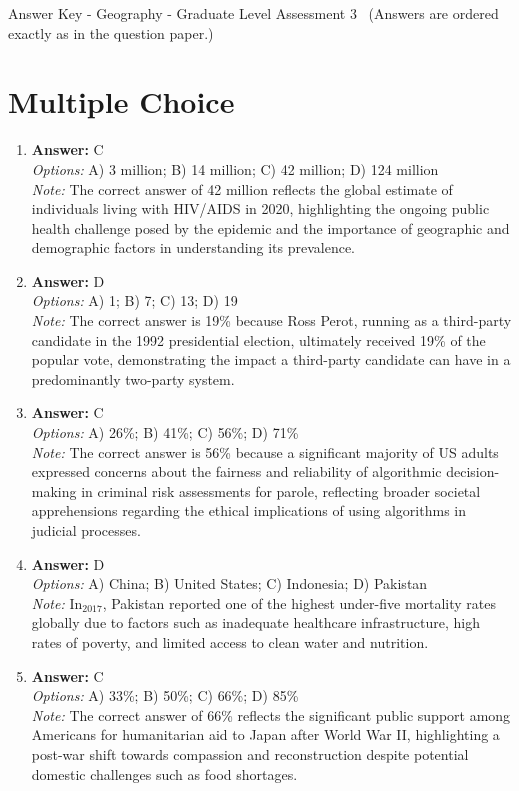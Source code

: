 \documentclass[12pt]{article}
\begin{document}
\begin{center}
Answer Key - Geography - Graduate Level Assessment 3 \
\small (Answers are ordered exactly as in the question paper.)
\end{center}

\section*{Multiple Choice}
\begin{enumerate}[label=\arabic*.]
\item \textbf{Answer:} C
\\ \textit{Options:} A) 3 million; B) 14 million; C) 42 million; D) 124 million
\\ \textit{Note:} The correct answer of 42 million reflects the global estimate of individuals living with HIV/AIDS in 2020, highlighting the ongoing public health challenge posed by the epidemic and the importance of geographic and demographic factors in understanding its prevalence.
\item \textbf{Answer:} D
\\ \textit{Options:} A) 1; B) 7; C) 13; D) 19
\\ \textit{Note:} The correct answer is 19\% because Ross Perot, running as a third-party candidate in the 1992 presidential election, ultimately received 19\% of the popular vote, demonstrating the impact a third-party candidate can have in a predominantly two-party system.
\item \textbf{Answer:} C
\\ \textit{Options:} A) 26\%; B) 41\%; C) 56\%; D) 71\%
\\ \textit{Note:} The correct answer is 56\% because a significant majority of US adults expressed concerns about the fairness and reliability of algorithmic decision-making in criminal risk assessments for parole, reflecting broader societal apprehensions regarding the ethical implications of using algorithms in judicial processes.
\item \textbf{Answer:} D
\\ \textit{Options:} A) China; B) United States; C) Indonesia; D) Pakistan
\\ \textit{Note:} In$_{2017}$, Pakistan reported one of the highest under-five mortality rates globally due to factors such as inadequate healthcare infrastructure, high rates of poverty, and limited access to clean water and nutrition.
\item \textbf{Answer:} C
\\ \textit{Options:} A) 33\%; B) 50\%; C) 66\%; D) 85\%
\\ \textit{Note:} The correct answer of 66\% reflects the significant public support among Americans for humanitarian aid to Japan after World War II, highlighting a post-war shift towards compassion and reconstruction despite potential domestic challenges such as food shortages.
\end{enumerate}
\end{document}
